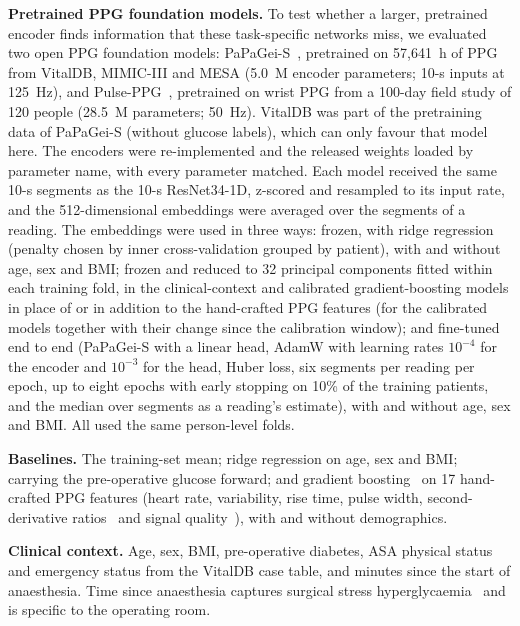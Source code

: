 \documentclass[11pt]{article}
\begin{document}
\textbf{Pretrained PPG foundation models.} To test whether a larger, pretrained encoder finds information that these task-specific networks miss, we evaluated two open PPG foundation models: PaPaGei-S~\citep{pillai2025}, pretrained on 57,641~h of PPG from VitalDB, MIMIC-III and MESA (5.0~M encoder parameters; 10-s inputs at 125~Hz), and Pulse-PPG~\citep{saha2025}, pretrained on wrist PPG from a 100-day field study of 120 people (28.5~M parameters; 50~Hz). VitalDB was part of the pretraining data of PaPaGei-S (without glucose labels), which can only favour that model here. The encoders were re-implemented and the released weights loaded by parameter name, with every parameter matched. Each model received the same 10-s segments as the 10-s ResNet34-1D, z-scored and resampled to its input rate, and the 512-dimensional embeddings were averaged over the segments of a reading. The embeddings were used in three ways: frozen, with ridge regression (penalty chosen by inner cross-validation grouped by patient), with and without age, sex and BMI; frozen and reduced to 32 principal components fitted within each training fold, in the clinical-context and calibrated gradient-boosting models in place of or in addition to the hand-crafted PPG features (for the calibrated models together with their change since the calibration window); and fine-tuned end to end (PaPaGei-S with a linear head, AdamW with learning rates $10^{-4}$ for the encoder and $10^{-3}$ for the head, Huber loss, six segments per reading per epoch, up to eight epochs with early stopping on 10\% of the training patients, and the median over segments as a reading's estimate), with and without age, sex and BMI. All used the same person-level folds.

\textbf{Baselines.} The training-set mean; ridge regression on age, sex and BMI; carrying the pre-operative glucose forward; and gradient boosting~\citep{friedman2001,pedregosa2011} on 17 hand-crafted PPG features (heart rate, variability, rise time, pulse width, second-derivative ratios~\citep{elgendi2012} and signal quality~\citep{elgendi2016}), with and without demographics.

\textbf{Clinical context.} Age, sex, BMI, pre-operative diabetes, ASA physical status and emergency status from the VitalDB case table, and minutes since the start of anaesthesia. Time since anaesthesia captures surgical stress hyperglycaemia~\citep{duggan2017} and is specific to the operating room.
\end{document}
